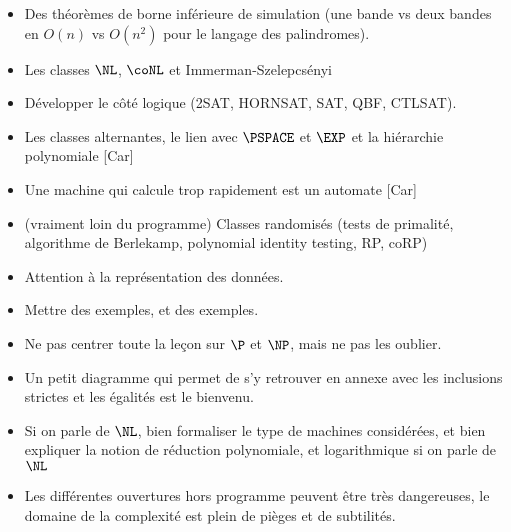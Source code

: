 \documentclass{agregfiche}
\begin{document}
\secidees

\begin{itemize}
    \item Des théorèmes de borne inférieure de simulation
      (une bande vs deux bandes en $O(n)$ vs $O(n^2)$
      pour le langage des palindromes).
    \item Les classes $\NL$, $\coNL$ et Immerman-Szelepcsényi
    \item Développer le côté logique (2SAT, HORNSAT, SAT, QBF, CTLSAT).
    \item Les classes alternantes, le lien avec
      $\PSPACE$ et $\EXP$ et la hiérarchie polynomiale [Car]
    \item Une machine qui calcule trop rapidement est un automate
      [Car]
    \item (vraiment loin du programme) Classes randomisés (tests de primalité, algorithme de Berlekamp,
      polynomial identity testing, RP, coRP)

\end{itemize}

\secpieges

\begin{itemize}
    \item Attention à la représentation des données.
    \item Mettre des exemples, et des exemples.
    \item Ne pas centrer toute la leçon sur $\P$ et $\NP$, mais ne pas les oublier.
    \item Un petit diagramme qui permet de s'y retrouver
      en annexe avec les inclusions strictes et les égalités est le bienvenu.
    \item Si on parle de $\NL$, bien formaliser le type de machines
        considérées,  et bien expliquer la notion de réduction polynomiale,
        et logarithmique si on parle de $\NL$
    \item Les différentes ouvertures hors programme peuvent être très dangereuses, le domaine de la complexité est plein de pièges et de subtilités.


\end{itemize}


\secquestionsclassiques
\end{document}
